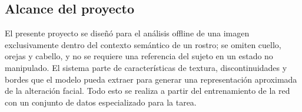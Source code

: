 \subsection{Alcance del proyecto}
El presente proyecto se diseñó para el análisis offline de una imagen exclusivamente dentro del contexto semántico de un rostro; se omiten cuello, orejas y cabello, y no se requiere una referencia del sujeto en un estado no manipulado. El sistema parte de características de textura, discontinuidades y bordes que el modelo pueda extraer para generar una representación aproximada de la alteración facial. Todo esto se realiza a partir del entrenamiento de la red con un conjunto de datos especializado para la tarea.
